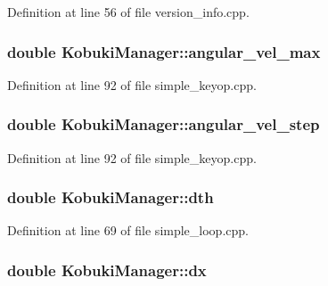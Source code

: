 \-Definition at line 56 of file version\-\_\-info.\-cpp.

\subsubsection[{angular\-\_\-vel\-\_\-max}]{\setlength{\rightskip}{0pt plus 5cm}double {\bf \-Kobuki\-Manager\-::angular\-\_\-vel\-\_\-max}\hspace{0.3cm}{\ttfamily  [private]}}\label{classKobukiManager_a8408167196dcf0cc63ce92fa1c3ecd5d}


\-Definition at line 92 of file simple\-\_\-keyop.\-cpp.

\subsubsection[{angular\-\_\-vel\-\_\-step}]{\setlength{\rightskip}{0pt plus 5cm}double {\bf \-Kobuki\-Manager\-::angular\-\_\-vel\-\_\-step}\hspace{0.3cm}{\ttfamily  [private]}}\label{classKobukiManager_abadd804c057bd66d7703d99bd0389fa2}


\-Definition at line 92 of file simple\-\_\-keyop.\-cpp.

\subsubsection[{dth}]{\setlength{\rightskip}{0pt plus 5cm}double {\bf \-Kobuki\-Manager\-::dth}\hspace{0.3cm}{\ttfamily  [private]}}\label{classKobukiManager_aae56a5aba9c5860a6a4c0825838578e5}


\-Definition at line 69 of file simple\-\_\-loop.\-cpp.

\subsubsection[{dx}]{\setlength{\rightskip}{0pt plus 5cm}double {\bf \-Kobuki\-Manager\-::dx}\hspace{0.3cm}{\ttfamily  [private]}}\label{classKobukiManager_ae27c93049cd6d6a5b8ab94ee16a5e1fa}


